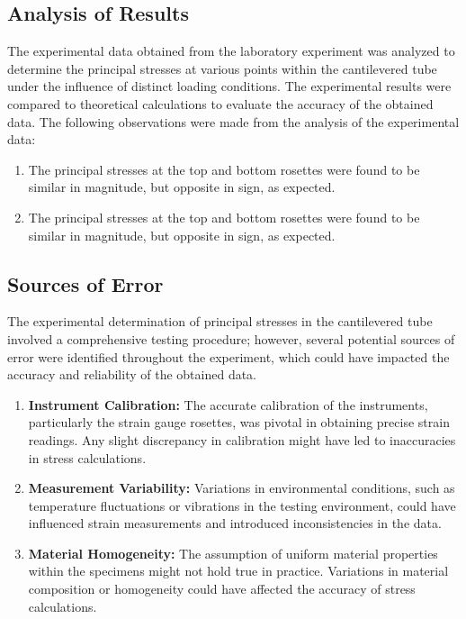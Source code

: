 \documentclass[12pt, titlepage]{article}
\begin{document}
\subsection{Analysis of Results}
The experimental data obtained from the laboratory experiment was analyzed to
determine the principal stresses at various points within the cantilevered tube
under the influence of distinct loading conditions. The experimental results
were compared to theoretical calculations to evaluate the accuracy of the
obtained data. The following observations were made from the analysis of the
experimental data:
\begin{enumerate}
    \item The principal stresses at the top and bottom rosettes were found to
      be similar in magnitude, but opposite in sign, as expected.
    \item The principal stresses at the top and bottom rosettes were found to
      be similar in magnitude, but opposite in sign, as expected.
\end{enumerate}
\subsection{Sources of Error}
The experimental determination of principal stresses in the cantilevered tube
involved a comprehensive testing procedure; however, several potential sources
of error were identified throughout the experiment, which could have impacted
the accuracy and reliability of the obtained data.

\begin{enumerate}
    \item \textbf{Instrument Calibration:} The accurate calibration of the
      instruments, particularly the strain gauge rosettes, was pivotal in
      obtaining precise strain readings. Any slight discrepancy in calibration
      might have led to inaccuracies in stress calculations.
    
    \item \textbf{Measurement Variability:} Variations in environmental
      conditions, such as temperature fluctuations or vibrations in the testing
      environment, could have influenced strain measurements and introduced
      inconsistencies in the data.
    
    \item \textbf{Material Homogeneity:} The assumption of uniform material
      properties within the specimens might not hold true in practice.
      Variations in material composition or homogeneity could have affected the
      accuracy of stress calculations.

\end{enumerate}
\end{document}
